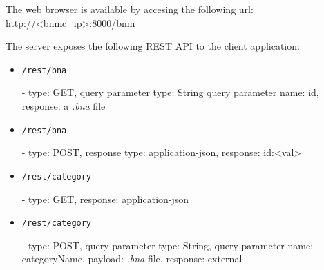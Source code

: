 The web browser is available by accesing the following url: http://<bnmc_ip>:8000/bnm

The server exposes the following REST API to the client application:
\begin{itemize}
	\item \begin{verbatim}/rest/bna\end{verbatim} - type: GET, query parameter type: String query parameter name: id, response: a \emph{.bna} file
	\item \begin{verbatim}/rest/bna\end{verbatim} - type: POST, response type: application-json, response: {id:<val>}
	\item \begin{verbatim}/rest/category\end{verbatim} - type: GET, response: application-json
	\item \begin{verbatim}/rest/category\end{verbatim} - type: POST, query parameter type: String, query parameter name: categoryName, payload: \emph{.bna} file, response: external
\end{itemize}


